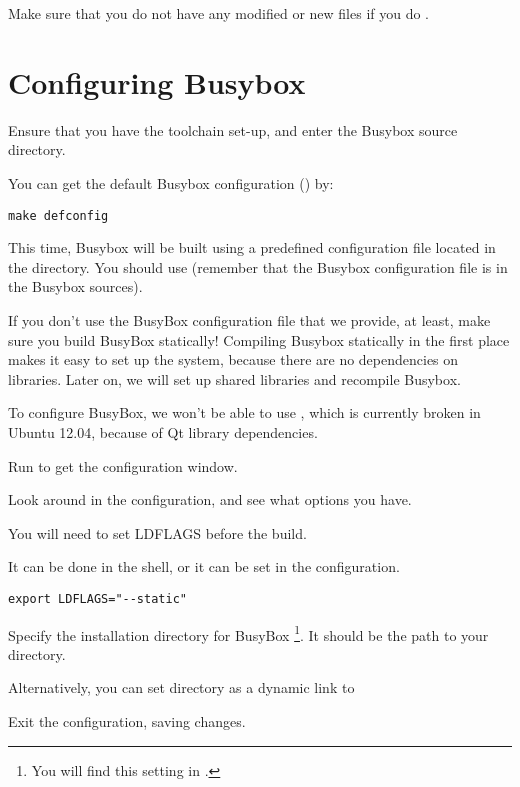 Make sure that you do not have any modified or new files if you do .

\section{Configuring Busybox}

Ensure that you have the toolchain set-up, and enter the Busybox source directory.

You can get the default Busybox configuration () by:

\begin{verbatim}
make defconfig
\end{verbatim}

This time, Busybox will be built using a predefined configuration file located in the 
 directory. You should use 
(remember that the Busybox configuration file is  in the Busybox sources).

If you don't use the BusyBox configuration file that we provide, at least,
make sure you build BusyBox statically! Compiling Busybox
statically in the first place makes it easy to set up the system,
because there are no dependencies on libraries. Later on, we will set
up shared libraries and recompile Busybox.

To configure BusyBox, we won't be able to use ,
which is currently broken in Ubuntu 12.04, because of Qt library
dependencies.

Run  to get the configuration window.

Look around in the configuration, and see what options you have.

You will need to set LDFLAGS before the build.

It can be done in the shell, or it can be set in the configuration.

\begin{verbatim}
export LDFLAGS="--static"
\end{verbatim}

Specify the installation directory for BusyBox
\footnote{You will find this setting in
.}.
It should be the path to your  directory.

Alternatively, you can set  directory as a dynamic link
to 

Exit the configuration, saving changes.

